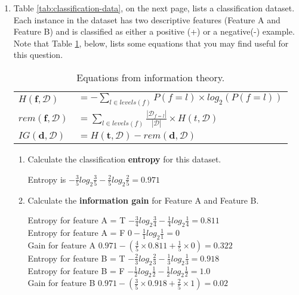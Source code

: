 \documentclass[nosolution]{ditpaper}
\begin{document}
\begin{enumerate}
		\item Table \ref{tab:classification-data}, on the next page, lists a classification dataset. Each instance in the dataset has two descriptive features (Feature A and Feature B) and is classified as either a positive (+) or a negative(-) example. Note that Table \ref{tab:info-eqs}, below, lists some equations that you may find useful for this question.		
			\begin{table}[htb]
			\renewcommand{\arraystretch}{2}
	\begin{center}
	\caption{Equations from information theory.}
	\label{tab:info-eqs}
		\begin{tabular}{ll}
	\hline
	$H(\mathbf{f}, \mathcal{D})$ & $= -\displaystyle\sum_{l \in levels(f)} P(f=l) \times log_2(P(f=l))$\\
	$rem(\mathbf{f}, \mathcal{D})$ & $=\displaystyle\sum_{l \in levels(f)} \frac{|\mathcal{D}_{f=l}|}{|\mathcal{D}|} \times H(t, \mathcal{D})$\\
	$IG(\mathbf{d},\mathcal{D})$ & $=H(\mathbf{t}, \mathcal{D})-rem(\mathbf{d}, \mathcal{D})$\\
	\hline
	\end{tabular}
	\end{center}
	\end{table}
				\begin{enumerate}
			\item Calculate the classification \textbf{entropy} for this dataset.
			\begin{answer}
				Entropy is $-\frac{3}{5}log_2\frac{3}{5}-\frac{2}{5}log_2\frac{2}{5}=0.971$
			\end{answer}
			\item Calculate the \textbf{information gain} for Feature A and Feature B.
			\begin{answer}
				Entropy for feature A = T $-\frac{3}{4}log_2\frac{3}{4}-\frac{1}{4}log_2\frac{1}{4}=0.811$\\
				Entropy for feature A = F $0-\frac{1}{1}log_2\frac{1}{1}=0$\\
				Gain for feature A $0.971-(\frac{4}{5}\times0.811+\frac{1}{5}\times0)=0.322$\\
				Entropy for feature B = T $-\frac{2}{3}log_2\frac{2}{3}-\frac{1}{3}log_2\frac{1}{3}=0.918$\\
				Entropy for feature B = F $-\frac{1}{2}log_2\frac{1}{2}-\frac{1}{2}log_2\frac{1}{2}=1.0$\\
				Gain for feature B $0.971-(\frac{3}{5}\times0.918+\frac{2}{5}\times1)=0.02$\\
			\end{answer}
		\end{enumerate}
	\end{enumerate}
\end{document}
